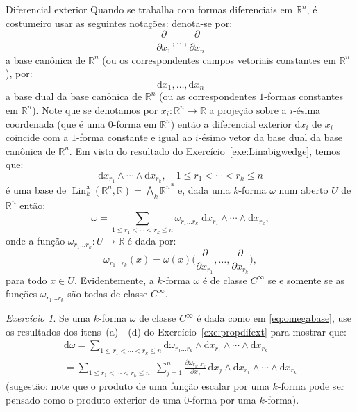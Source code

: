 \documentclass[oneside,11pt]{amsart}
\newcommand{\R}{\mathds R}
\newcommand{\dd}{\mathrm d}
\DeclareMathOperator{\Lin}{Lin}
\theoremstyle{remark}\newtheorem{exercise}{Exercício}[section]
\theoremstyle{plain}\newtheorem{teo}{Teorema}[section]
\theoremstyle{plain}\newtheorem{lem}[teo]{Lema}
\theoremstyle{plain}\newtheorem{prop}[teo]{Proposição}
\theoremstyle{definition}\newtheorem{defin}[teo]{Definição}
\theoremstyle{remark}\newtheorem{rem}[teo]{Observação}
\theoremstyle{definition}\newtheorem{example}[teo]{Exemplo}
\numberwithin{equation}{section}
\begin{document}
\begin{section}{Diferencial exterior}
Quando se trabalha com formas diferenciais em $\R^n$, é costumeiro usar as seguintes notações: denota-se por:
\[\frac{\partial}{\partial x_1},\ldots,\frac{\partial}{\partial x_n}\]
a base canônica de $\R^n$ (ou os correspondentes campos vetoriais constantes em $\R^n$), por:
\[\dd x_1,\ldots,\dd x_n\]
a base dual da base canônica de $\R^n$ (ou as correspondentes $1$-formas constantes em $\R^n$). Note que se denotamos por $x_i:\R^n\to\R$ a projeção
sobre a $i$-ésima coordenada (que é uma $0$-forma em $\R^n$) então a diferencial exterior $\dd x_i$ de $x_i$ coincide com a $1$-forma constante e igual
ao $i$-ésimo vetor da base dual da base canônica de $\R^n$. Em vista do resultado do Exercício~\ref{exe:Linabigwedge}, temos que:
\[\dd x_{r_1}\wedge\cdots\wedge\dd x_{r_k},\quad1\le r_1<\cdots<r_k\le n\]
é uma base de $\Lin_k^{\mathrm a}(\R^n,\R)=\bigwedge_k{\R^n}^*$ e, dada uma $k$-forma $\omega$ num aberto $U$ de $\R^n$ então:
\begin{equation}\label{eq:omegabase}
\omega=\sum_{1\le r_1<\cdots<r_k\le n}\omega_{r_1\ldots r_k}\;\dd x_{r_1}\wedge\cdots\wedge\dd x_{r_k},
\end{equation}
onde a função $\omega_{r_1\ldots r_k}:U\to\R$ é dada por:
\[\omega_{r_1\ldots r_k}(x)=\omega(x)\Big(\frac{\partial}{\partial x_{r_1}},\ldots,\frac{\partial}{\partial x_{r_k}}\Big),\]
para todo $x\in U$. Evidentemente, a $k$-forma $\omega$ é de classe $C^\infty$ se e somente se as funções $\omega_{r_1\ldots r_k}$ são todas de classe
$C^\infty$.

\begin{exercise}
Se uma $k$-forma $\omega$ de classe $C^\infty$ é dada como em \eqref{eq:omegabase}, use os resultados dos itens~(a)---(d) do Exercício~\ref{exe:propdifext}
para mostrar que:
\begin{multline*}
\dd\omega=\sum_{1\le r_1<\cdots<r_k\le n}\dd\omega_{r_1\ldots r_k}\wedge\dd x_{r_1}\wedge\cdots\wedge\dd x_{r_k}\\
=\sum_{1\le r_1<\cdots<r_k\le n}\;\sum_{j=1}^n\frac{\partial\omega_{r_1\ldots r_k}}{\partial x_j}\,\dd x_j\wedge\dd x_{r_1}\wedge\cdots\wedge\dd x_{r_k}
\end{multline*}
(sugestão: note que o produto de uma função escalar por uma $k$-forma pode ser pensado como o produto exterior de uma $0$-forma por uma $k$-forma).
\end{exercise}

\end{section}
\end{document}
